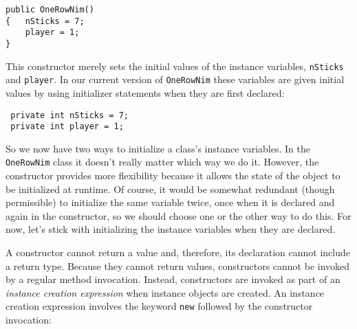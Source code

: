 \begin{jjjlisting}
\begin{lstlisting}
public OneRowNim()
{   nSticks = 7;
    player = 1;
}
\end{lstlisting}
\end{jjjlisting}

\noindent This constructor merely sets the initial values of the instance
variables, {\tt nSticks} and {\tt player}. In our current version of
{\tt OneRowNim} these variables are given initial values by using
initializer statements when they are first declared:

\begin{jjjlisting}
\begin{lstlisting}
 private int nSticks = 7;
 private int player = 1;
\end{lstlisting}
\end{jjjlisting}

\noindent So we now have two ways to initialize a class's instance
variables.  In the {\tt OneRowNim} class it doesn't really matter which
way we do it.  However, the constructor provides more flexibility
because it allows the state of the object to be initialized at runtime.  Of
course, it would be somewhat redundant (though permissible) to
initialize the same variable twice, once when it is declared and again
in the constructor, so we should choose one or the other way to do
this.   For now, let's stick with initializing the instance variables
when they are declared.


\noindent A constructor cannot return a value and, therefore, its
declaration cannot include a return type.  Because they cannot return
values, constructors cannot be invoked by a regular method
invocation.  Instead, constructors are invoked as part of an
{\it instance creation expression} when instance objects are created.  An
instance creation expression involves the keyword {\tt new} followed
by the constructor invocation:

